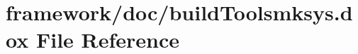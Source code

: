 \hypertarget{build_toolsmksys_8dox}{}\section{framework/doc/build\+Toolsmksys.dox File Reference}
\label{build_toolsmksys_8dox}
